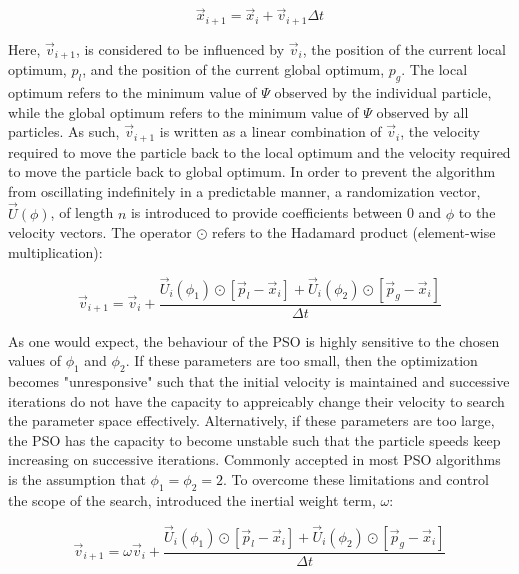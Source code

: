 \begin{equation}
\vec{x}_{i+1} = \vec{x}_i + \vec{v}_{i+1} \Delta t
\label{eqn:psoupdate}
\end{equation}

Here, $\vec{v}_{i+1}$, is considered to be influenced by $\vec{v}_i$, the position of the current local optimum, $p_l$, and the position of the current global optimum, $p_g$. The local optimum refers to the minimum value of $\Psi$ observed by the individual particle, while the global optimum refers to the minimum value of $\Psi$ observed by all particles. As such,  $\vec{v}_{i+1}$ is written as a linear combination of $\vec{v}_{i}$, the velocity required to move the particle back to the local optimum and the velocity required to move the particle back to global optimum. In order to prevent the algorithm from oscillating indefinitely in a predictable manner, a randomization vector, $\vec{U}\left(\phi\right)$, of length $n$ is introduced to provide coefficients between 0 and $\phi$ to the velocity vectors. The operator $\odot$ refers to the Hadamard product (element-wise multiplication):

\begin{equation}
\vec{v}_{i+1} = \vec{v}_i + \frac{\vec{U}_i\left(\phi_1\right)\odot\left[\vec{p}_l-\vec{x}_i\right] + \vec{U}_i\left(\phi_2\right)\odot\left[\vec{p}_g-\vec{x}_i\right]}{\Delta t}
\label{eqn:psobasic}
\end{equation}

As one would expect, the behaviour of the PSO is highly sensitive to the chosen values of $\phi_1$ and $\phi_2$. If these parameters are too small, then the optimization becomes "unresponsive" such that the initial velocity is maintained and successive iterations do not have the capacity to appreicably change their velocity to search the parameter space effectively. Alternatively, if these parameters are too large, the PSO has the capacity to become unstable such that the particle speeds keep increasing on successive iterations. Commonly accepted in most PSO algorithms is the assumption that $\phi_1 = \phi_2 = 2$. To overcome these limitations and control the scope of the search, \citet{Shi} introduced the inertial weight term, $\omega$:

\begin{equation}
\vec{v}_{i+1} = \omega\vec{v}_i + \frac{\vec{U}_i\left(\phi_1\right)\odot\left[\vec{p}_l-\vec{x}_i\right] + \vec{U}_i\left(\phi_2\right)\odot\left[\vec{p}_g-\vec{x}_i\right]}{\Delta t}
\label{eqn:psoinertia}
\end{equation}

